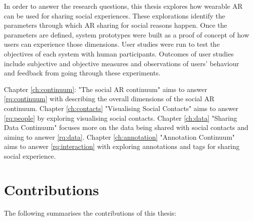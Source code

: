 In order to answer the research questions, this thesis explores how wearable AR can be used for sharing social experiences. These explorations identify the parameters through which AR sharing for social reasons happen. Once the parameters are defined, system prototypes were built as a proof of concept of how users can experience those dimensions. User studies were run to test the objectives of each system with human participants. Outcomes of user studies include subjective and objective measures and observations of users' behaviour and feedback from going through these experiments. 

Chapter \ref{ch:continuum}: "The social AR continuum" aims to answer \ref{rq:continuum} with describing the overall dimensions of the social AR continuum. 
Chapter \ref{ch:contacts} "Visualising Social Contacts" aims to answer \ref{rq:people} by exploring visualising social contacts. 
Chapter \ref{ch:data} "Sharing Data Continuum" focuses more on the data being shared with social contacts and aiming to answer \ref{rq:data}.
Chapter \ref{ch:annotation} "Annotation Continuum" aims to answer \ref{rq:interaction} with exploring annotations and tags for sharing social experience. 

\section{Contributions}

The following summarises the contributions of this thesis: 

